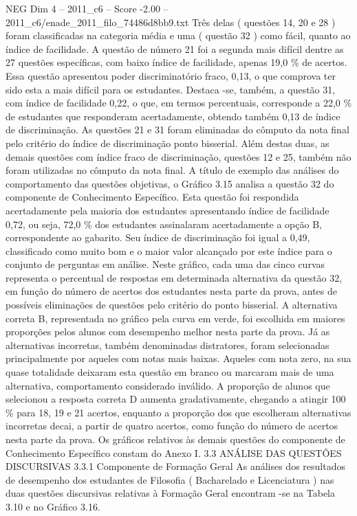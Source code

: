 \begin{textsample}{NEG Dim 4 – 2011\_c6 – Score -2.00 – 2011\_c6/enade\_2011\_filo\_74486d8bb9.txt}
Três delas ( questões 14, 20 e 28 ) foram classificadas na categoria média e uma ( questão 32 ) como fácil, quanto ao índice de facilidade.
A questão de número 21 foi a segunda mais difícil dentre as 27 questões específicas, com baixo índice de facilidade, apenas 19,0 \% de acertos.
Essa questão apresentou poder discriminatório fraco, 0,13, o que comprova ter sido esta a mais difícil para os estudantes.
Destaca -se, também, a questão 31, com índice de facilidade 0,22, o que, em termos percentuais, corresponde a 22,0 \% de estudantes que responderam acertadamente, obtendo também 0,13 de índice de discriminação.
As questões 21 e 31 foram eliminadas do cômputo da nota final pelo critério do índice de discriminação ponto bisserial.
Além destas duas, as demais questões com índice fraco de discriminação, questões 12 e 25, também não foram utilizadas no cômputo da nota final.
A título de exemplo das análises do comportamento das questões objetivas, o Gráfico 3.15 analisa a questão 32 do componente de Conhecimento Específico.
Esta questão foi respondida acertadamente pela maioria dos estudantes apresentando índice de facilidade 0,72, ou seja, 72,0 \% dos estudantes assinalaram acertadamente a opção B, correspondente ao gabarito.
Seu índice de discriminação foi igual a 0,49, classificado como muito bom e o maior valor alcançado por este índice para o conjunto de perguntas em análise.
Neste gráfico, cada uma das cinco curvas representa o percentual de respostas em determinada alternativa da questão 32, em função do número de acertos dos estudantes nesta parte da prova, antes de possíveis eliminações de questões pelo critério do ponto bisserial.
A alternativa correta B, representada no gráfico pela curva em verde, foi escolhida em maiores proporções pelos alunos com desempenho melhor nesta parte da prova.
Já as alternativas incorretas, também denominadas distratores, foram selecionadas principalmente por aqueles com notas mais baixas.
Aqueles com nota zero, na sua quase totalidade deixaram esta questão em branco ou marcaram mais de uma alternativa, comportamento considerado inválido.
A proporção de alunos que selecionou a resposta correta D aumenta gradativamente, chegando a atingir 100 \% para 18, 19 e 21 acertos, enquanto a proporção dos que escolheram alternativas incorretas decai, a partir de quatro acertos, como função do número de acertos nesta parte da prova.
Os gráficos relativos às demais questões do componente de Conhecimento Específico constam do Anexo I. 3.3 ANÁLISE DAS QUESTÕES DISCURSIVAS 3.3.1 Componente de Formação Geral As análises dos resultados de desempenho dos estudantes de Filosofia ( Bacharelado e Licenciatura ) nas duas questões discursivas relativas à Formação Geral encontram -se na Tabela 3.10 e no Gráfico 3.16.

\end{textsample}
